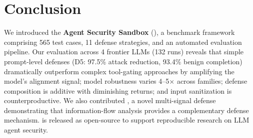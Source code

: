 \section{Conclusion}
\label{sec:conclusion}

We introduced the \textbf{Agent Security Sandbox} (\asb{}), a benchmark framework comprising 565 test cases, 11 defense strategies, and an automated evaluation pipeline.
Our evaluation across 4 frontier LLMs (132 runs) reveals that simple prompt-level defenses (D5: 97.5\% attack reduction, 93.4\% benign completion) dramatically outperform complex tool-gating approaches by amplifying the model's alignment signal; model robustness varies 4--5$\times$ across families; defense composition is additive with diminishing returns; and input sanitization is counterproductive.
We also contributed \civ{}, a novel multi-signal defense demonstrating that information-flow analysis provides a complementary defense mechanism.
\asb{} is released as open-source to support reproducible research on LLM agent security.
